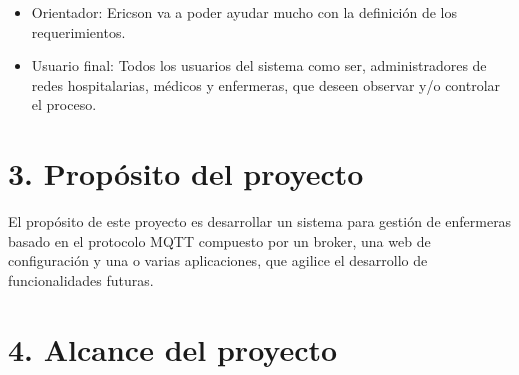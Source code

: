 \documentclass[
11pt, %
]{charter}
\begin{document}

 
\begin{itemize}
\item Orientador: Ericson va a poder ayudar mucho con la definición de los requerimientos.
\item Usuario final: Todos los usuarios del sistema como ser, administradores de redes hospitalarias, médicos y enfermeras, que deseen observar y/o controlar el proceso.

\end{itemize}





\section{3. Propósito del proyecto}
\label{sec:proposito}



El propósito de este proyecto es desarrollar un sistema para gestión de enfermeras basado en el protocolo MQTT compuesto por un broker, una web de configuración y una o varias aplicaciones, que agilice el desarrollo de funcionalidades futuras.



\section{4. Alcance del proyecto}
\label{sec:alcance}



\end{document}
